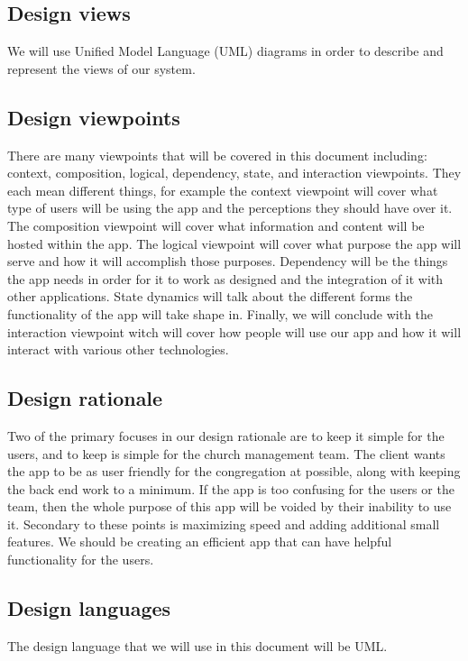\documentclass[letterpaper,10pt,draftclsnofoot,onecolumn,titlepage]{IEEEtran}
\begin{document}
		\subsection{Design views}
		We will use Unified Model Language (UML) diagrams in order to describe and represent the views of our system. 
		
		\subsection{Design viewpoints}
		There are many viewpoints that will be covered in this document including: context, composition, logical, dependency, state, and interaction viewpoints. 
		They each mean different things, for example the context viewpoint will cover what type of users will be using the app and the perceptions they should have over it. 
		The composition viewpoint will cover what information and content will be hosted within the app. 
		The logical viewpoint will cover what purpose the app will serve and how it will accomplish those purposes. 
		Dependency will be the things the app needs in order for it to work as designed and the integration of it with other applications. 
		State dynamics will talk about the different forms the functionality of the app will take shape in. 
		Finally, we will conclude with the interaction viewpoint witch will cover how people will use our app and how it will interact with various other technologies. 
		
		\subsection{Design rationale}
		Two of the primary focuses in our design rationale are to keep it simple for the users, and to keep is simple for the church management team. 
		The client wants the app to be as user friendly for the congregation at possible, along with keeping the back end work to a minimum. 
		If the app is too confusing for the users or the team, then the whole purpose of this app will be voided by their inability to use it. 
		Secondary to these points is maximizing speed and adding additional small features. 
		We should be creating an efficient app that can have helpful functionality for the users. 
		
		\subsection{Design languages}
		The design language that we will use in this document will be UML. 
		
\end{document}
